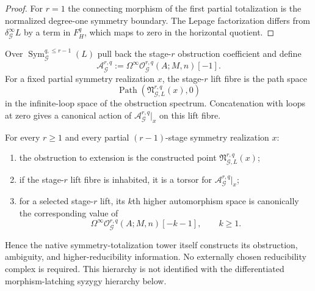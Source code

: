 \begin{proof}
For $r=1$ the connecting morphism of the first partial totalization is the
normalized degree-one symmetry boundary.  The Lepage factorization differs from
$\delta_{\mathcal G}^{\infty}L$ by a term in
$F_H^q$, which maps to zero in the horizontal quotient.
\end{proof}

\begin{construction}
\label{constr:symmetry-noether-native-ambiguity-coefficients}
Over $\operatorname{Sym}_{\mathcal G}^{q,\le r-1}(L)$ pull back the stage-$r$
obstruction coefficient and define
\[
\boxed{
\mathcal A_{\mathcal G}^{r,q}
:=
\Omega^\infty
\mathcal O_{\mathcal G}^{r,q}(A;M,n)[-1].
}
\]
For a fixed partial symmetry realization $x$, the stage-$r$ lift fibre is the path
space
\[
\operatorname{Path}
\left(
\mathfrak N_{\mathcal G,L}^{r,q}(x),0
\right)
\]
in the infinite-loop space of the obstruction spectrum.  Concatenation with loops
at zero gives a canonical action of
$\mathcal A_{\mathcal G}^{r,q}|_x$ on this lift fibre.
\end{construction}

\begin{theorem}
\label{thm:symmetry-noether-native-obstruction-ambiguity-and-higher-automorphisms}
For every $r\ge1$ and every partial $(r-1)$-stage symmetry realization $x$:
\begin{enumerate}
\item the obstruction to extension is the constructed point
      $\mathfrak N_{\mathcal G,L}^{r,q}(x)$;
\item if the stage-$r$ lift fibre is inhabited, it is a torsor for
      $\mathcal A_{\mathcal G}^{r,q}|_x$;
\item for a selected stage-$r$ lift, its $k$th higher automorphism space is canonically
      the corresponding value of
      \[
      \Omega^\infty
      \mathcal O_{\mathcal G}^{r,q}(A;M,n)[-k-1],
      \qquad k\ge1.
      \]
\end{enumerate}
Hence the native symmetry-totalization tower itself constructs its obstruction,
ambiguity, and higher-reducibility information.  No externally chosen reducibility
complex is required.  This hierarchy is not identified with the differentiated
morphism-latching syzygy hierarchy below.
\end{theorem}

